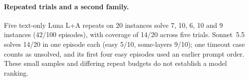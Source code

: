 \paragraph{Repeated trials and a second family.}
Five text-only Luna L+A repeats on 20 instances solve 7, 10, 6, 10 and 9 instances
(42/100 episodes), with coverage of 14/20 across five trials. Sonnet~5.5 solves
14/20 in one episode each (easy 5/10, some-layers 9/10); one timeout case counts as
unsolved, and its first four easy episodes used an earlier prompt order. These
small samples and differing repeat budgets do not establish a model ranking.
\label{sec:results-difficulty}\label{sec:results-threats}
